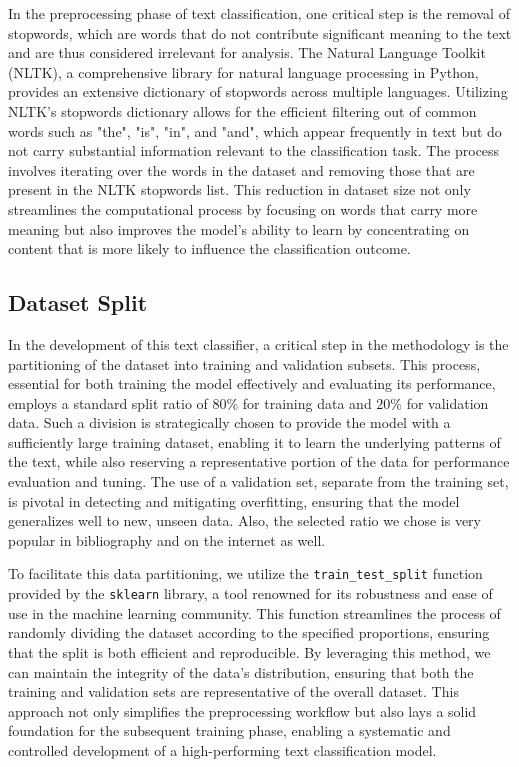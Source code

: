 In the preprocessing phase of text classification, one critical step is the removal of stopwords, which are words that do not contribute significant meaning to the text and are thus considered irrelevant for analysis.
The Natural Language Toolkit (NLTK), a comprehensive library for natural language processing in Python, provides an extensive dictionary of stopwords across multiple languages. Utilizing NLTK's stopwords dictionary allows for the efficient filtering out of common words such as "the", "is", "in", and "and", which appear frequently in text but do not carry substantial information relevant to the classification task.
The process involves iterating over the words in the dataset and removing those that are present in the NLTK stopwords list.
This reduction in dataset size not only streamlines the computational process by focusing on words that carry more meaning but also improves the model's ability to learn by concentrating on content that is more likely to influence the classification outcome.

\subsection{Dataset Split}
In the development of this text classifier, a critical step in the methodology is the partitioning of the dataset into training and validation subsets.
This process, essential for both training the model effectively and evaluating its performance, employs a standard split ratio of $80\%$ for training data and $20\%$ for validation data.
Such a division is strategically chosen to provide the model with a sufficiently large training dataset, enabling it to learn the underlying patterns of the text, while also reserving a representative portion of the data for performance evaluation and tuning.
The use of a validation set, separate from the training set, is pivotal in detecting and mitigating overfitting, ensuring that the model generalizes well to new, unseen data.
Also, the selected ratio we chose is very popular in bibliography and on the internet as well.

To facilitate this data partitioning, we utilize the \verb|train_test_split| function provided by the \verb|sklearn| library, a tool renowned for its robustness and ease of use in the machine learning community. This function streamlines the process of randomly dividing the dataset according to the specified proportions, ensuring that the split is both efficient and reproducible. By leveraging this method, we can maintain the integrity of the data's distribution, ensuring that both the training and validation sets are representative of the overall dataset. This approach not only simplifies the preprocessing workflow but also lays a solid foundation for the subsequent training phase, enabling a systematic and controlled development of a high-performing text classification model.

